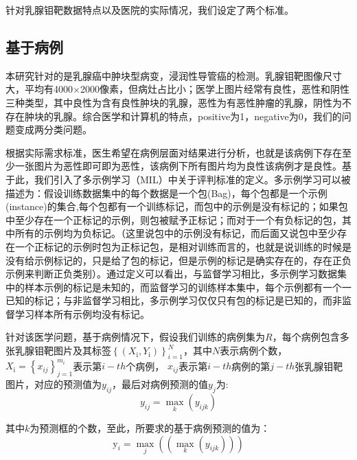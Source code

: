 针对乳腺钼靶数据特点以及医院的实际情况，我们设定了两个标准。

\subsection{基于病例}
本研究针对的是乳腺癌中肿块型病变，浸润性导管癌的检测。乳腺钼靶图像尺寸大，平均有4000×2000像素，但病灶占比小；医学上图片经常有良性，恶性和阴性三种类型，其中良性为含有良性肿块的乳腺，恶性为有恶性肿瘤的乳腺，阴性为不存在肿块的乳腺。综合医学和计算机的特点，positive为1，negative为0，我们的问题变成两分类问题。

根据实际需求标准，医生希望在病例层面对结果进行分析，也就是该病例下存在至少一张图片为恶性即可即为恶性，该病例下所有图片均为良性该病例才是良性。基于此，我们引入了多示例学习（MIL）\cite{34Dietterich1997Solving}中关于评判标准的定义。多示例学习可以被描述为：假设训练数据集中的每个数据是一个包(Bag)，每个包都是一个示例(instance)的集合,每个包都有一个训练标记，而包中的示例是没有标记的；如果包中至少存在一个正标记的示例，则包被赋予正标记；而对于一个有负标记的包，其中所有的示例均为负标记。（这里说包中的示例没有标记，而后面又说包中至少存在一个正标记的示例时包为正标记包，是相对训练而言的，也就是说训练的时候是没有给示例标记的，只是给了包的标记，但是示例的标记是确实存在的，存在正负示例来判断正负类别）。通过定义可以看出，与监督学习相比，多示例学习数据集中的样本示例的标记是未知的，而监督学习的训练样本集中，每个示例都有一个一已知的标记；与非监督学习相比，多示例学习仅仅只有包的标记是已知的，而非监督学习样本所有示例均没有标记。

针对该医学问题，基于病例情况下，假设我们训练的病例集为$R$，每个病例包含多张乳腺钼靶图片及其标签$\left\{\left(X_{\mathrm{i}}, Y_{\mathrm{i}}\right)\right\}_{i=1}^{N}$，其中$N$表示病例个数，$X_{\mathrm{i}}=\left\{x_{i j}\right\}_{j=1}^{m_{i}}$表示第$i-th$个病例， $x_{i j}$表示第$i-th$病例的第$j-th$张乳腺钼靶图片，对应的预测值为$y_{i j}$，最后对病例预测的值$y_{j}$为:
\begin{equation}
	y_{i j}=\max _{k}\left(y_{i j k}\right)
\end{equation}

其中$k$为预测框的个数，至此，所要求的基于病例预测的值为：
\begin{equation}
	\mathrm{y}_{i}=\max _{j}\left(\left(\max _{k}\left(y_{i j k}\right)\right)\right)
\end{equation}


